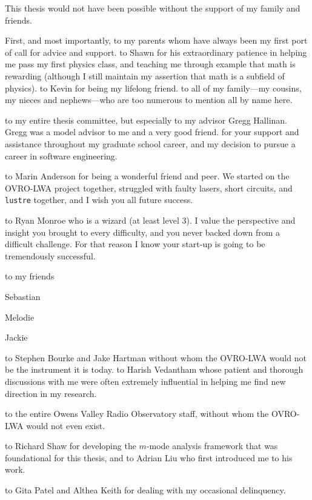 \documentclass[12pt]{caltech_thesis}
\begin{document}
\begin{acknowledgements}
    This thesis would not have been possible without the support of my family and friends.

    First, and most importantly, \ty to my parents whom have always been my first port of call for
    advice and support.  \Ty to Shawn for his extraordinary patience in helping me pass my first
    physics class, and teaching me through example that math is rewarding (although I still maintain
    my assertion that math is a subfield of physics).  \Ty to Kevin for being my lifelong friend.
    \Ty to all of my family---my cousins, my nieces and nephews---who are too numerous to mention
    all by name here.

    \Ty to my entire thesis committee, but especially to my advisor Gregg Hallinan. Gregg was a
    model advisor to me and a very good friend. \Ty for your support and assistance throughout my
    graduate school career, and my decision to pursue a career in software engineering.

    \Ty to Marin Anderson for being a wonderful friend and peer. We started on the OVRO-LWA project
    together, struggled with faulty lasers, short circuits, and \texttt{lustre} together, and I wish
    you all future success.

    \Ty to Ryan Monroe who is a wizard (at least level 3). I value the perspective and insight you
    brought to every difficulty, and you never backed down from a difficult challenge. For that
    reason I know your start-up is going to be tremendously successful.

    \Ty to my friends

    Sebastian

    Melodie

    Jackie

    \Ty to Stephen Bourke and Jake Hartman without whom the OVRO-LWA would not be the instrument it
    is today. \Ty to Harish Vedantham whose patient and thorough discussions with me were often
    extremely influential in helping me find new direction in my research.

    \Ty to the entire Owens Valley Radio Observatory staff, without whom the OVRO-LWA would not even
    exist.

    \Ty to Richard Shaw for developing the $m$-mode analysis framework that was foundational for
    this thesis, and to Adrian Liu who first introduced me to his work.

    \Ty to Gita Patel and Althea Keith for dealing with my occasional delinquency.


\end{acknowledgements}
\end{document}
